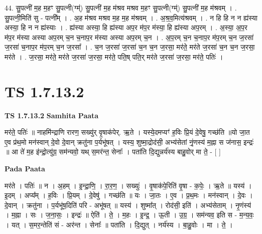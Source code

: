 \documentclass[17pt]{extarticle}
\begin{document}
44. सु॒पत्नी॑ म॒ह म॒हꣳ सु॒पत्नी(ग्म्॑) सु॒पत्नी॑ म॒ह म॑श्रव मश्रव म॒हꣳ सु॒पत्नी(ग्म्॑) सु॒पत्नी॑ म॒ह म॑श्रवम् । . सु॒पत्नी॒मिति॑ सु - पत्नी᳚म् । . अ॒ह म॑श्रव मश्रव म॒ह म॒ह म॑श्रवम् । . अ॒श्र॒व॒मित्य॑श्रवम् । . न हि हि न न ह्य॑स्या अस्या॒ हि न न ह्य॑स्याः । . ह्य॑स्या अस्या॒ हि ह्य॑स्या अप॒र म॑प॒र म॑स्या॒ हि ह्य॑स्या अप॒रम् । . अ॒स्या॒ अ॒प॒र म॑प॒र म॑स्या अस्या अप॒रम् च॒न च॒नाप॒र म॑स्या अस्या अप॒रम् च॒न । . अ॒प॒रम् च॒न च॒नाप॒र म॑प॒रम् च॒न ज॒रसा॑ ज॒रसा॑ च॒नाप॒र म॑प॒रम् च॒न ज॒रसा᳚ । . च॒न ज॒रसा॑ ज॒रसा॑ च॒न च॒न ज॒रसा॒ मर॑ते॒ मर॑ते ज॒रसा॑ च॒न च॒न ज॒रसा॒ मर॑ते । . ज॒रसा॒ मर॑ते॒ मर॑ते ज॒रसा॑ ज॒रसा॒ मर॑ते॒ पति॒ष् पति॒र् मर॑ते ज॒रसा॑ ज॒रसा॒ मर॑ते॒ पतिः॑ । \newline
\pagebreak
{}

\section{ TS 1.7.13.2 }

\textbf{TS 1.7.13.2 } \newline
\textbf{Samhita Paata} \newline

मर॑ते॒ पतिः॑ ॥ नाहमि॑न्द्राणि रारण॒ सख्यु॑र् वृ॒षाक॑पेर्. ऋ॒ते । यस्ये॒दमप्यꣳ॑ ह॒विः प्रि॒यं दे॒वेषु॒ गच्छ॑ति ॥यो जा॒त ए॒व प्र॑थ॒मो मन॑स्वान् दे॒वो दे॒वान् क्रतु॑ना प॒र्यभू॑षत् । यस्य॒ शुष्मा॒द्रोद॑सी॒ अभ्य॑सेतां नृं॒णस्य॑ म॒ह्ना स ज॑नास॒ इन्द्रः॑ ॥ आ ते॑ म॒ह इ॑न्द्रो॒त्यु॑ग्र॒ सम॑न्यवो॒ यथ् स॒मर॑न्त॒ सेनाः᳚ । पता॑ति दि॒द्युन्नर्य॑स्य बाहु॒वोर् मा ते॒ - [ ] \newline

\textbf{Pada Paata} \newline

मर॑ते । पतिः॑ ॥ न । अ॒हम् । इ॒न्द्रा॒णि॒ । रा॒र॒ण॒ । सख्युः॑ । वृ॒षाक॑पे॒रिति॑ वृ॒षा - क॒पेः॒ । ऋ॒ते ॥ यस्य॑ । इ॒दम् । अप्य᳚म् । ह॒विः । प्रि॒यम् । दे॒वेषु॑ । गच्छ॑ति ॥ यः । जा॒तः । ए॒व । प्र॒थ॒मः । मन॑स्वान् । दे॒वः । दे॒वान् । क्रतु॑ना । प॒र्यभू॑ष॒दिति॑ परि - अभू॑षत् ॥ यस्य॑ । शुष्मा᳚त् । रोद॑सी॒ इति॑ । अभ्य॑सेताम् । नृ॒णंस्य॑ । म॒ह्ना । सः । ज॒ना॒सः॒ । इन्द्रः॑ ॥ ऐति॑ । ते॒ । म॒हः । इ॒न्द्र॒ । ऊ॒ती । उ॒ग्र॒ । सम॑न्यव॒ इति स - म॒न्य॒वः॒ । यत् । स॒मर॒न्तेति॑ सं - अर॑न्त । सेनाः᳚ ॥ पता॑ति । दि॒द्युत् । नर्य॑स्य । बा॒हु॒वोः । मा । ते॒ ।  \newline
\end{document}
